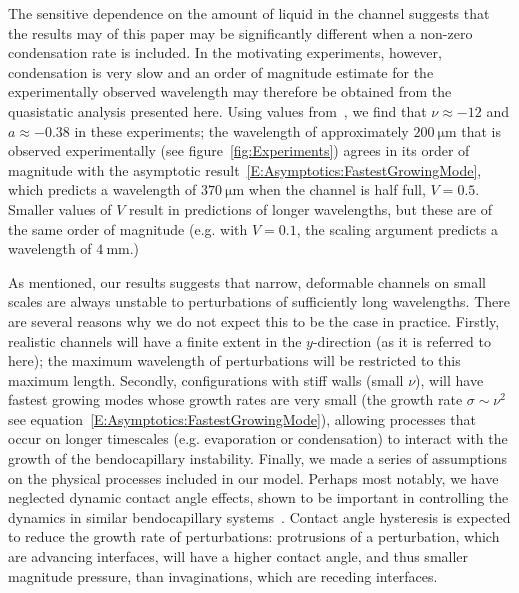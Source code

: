 \documentclass{jfm}
\newcommand{\aspect}{a} %
\begin{document}

The sensitive dependence on the amount of liquid in the channel suggests that the results may of this paper may be significantly different when a non-zero condensation rate is included. In the motivating experiments, however, condensation is very slow and an order of magnitude estimate for the experimentally observed wavelength may therefore be obtained from the quasistatic analysis presented here. Using values from~\cite{Seemann2011JPhysCondMat}, we find that $\nu \approx -12$ and $\aspect \approx -0.38$ in these experiments; the wavelength of approximately $200~\si{\micro \meter}$ that is observed experimentally (see figure~\ref{fig:Experiments}) agrees in its order of magnitude with the asymptotic result~\eqref{E:Asymptotics:FastestGrowingMode}, which predicts a wavelength of $370~\si{\micro \meter}$ when the channel is half full, $V = 0.5$. Smaller values of $V$ result in predictions of longer wavelengths, but these are of the same order of magnitude (e.g. with $V = 0.1$, the scaling argument predicts a wavelength of $4~\si{\milli \meter}$.) 

As mentioned, our results suggests that narrow, deformable channels on small scales are always unstable to perturbations of sufficiently long wavelengths. There are several reasons why we do not expect this to be the case in practice. Firstly, realistic channels will have a finite extent in the $y$-direction (as it is referred to here); the maximum wavelength of perturbations will be restricted to this maximum length. Secondly, configurations with stiff walls (small $\nu$), will have fastest growing modes whose growth rates are very small (the growth rate $\sigma \sim \nu^2$ see equation~\eqref{E:Asymptotics:FastestGrowingMode}), allowing processes that occur on longer timescales (e.g. evaporation or condensation) to interact with the growth of the bendocapillary instability. Finally, we made a series of assumptions on the physical processes included in our model. Perhaps most notably, we have neglected dynamic contact angle effects, shown to be important in controlling the dynamics in similar bendocapillary systems~\citep[e.g][]{Bradley2021PRF}. Contact angle hysteresis is expected to reduce the growth rate of perturbations: protrusions of a perturbation, which are advancing interfaces, will have a higher contact angle, and thus smaller magnitude pressure, than invaginations, which are receding interfaces.
\end{document}
